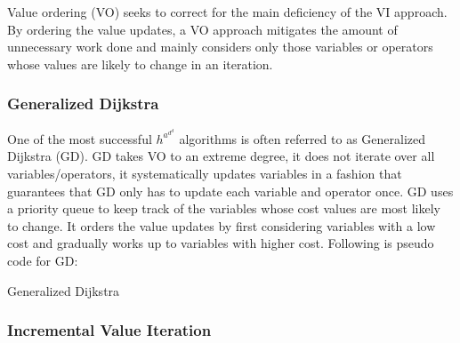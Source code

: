 Value ordering (VO) seeks to correct for the main deficiency of the VI approach. By ordering the value updates, a VO approach mitigates the amount of unnecessary work done and mainly considers only those variables or operators whose values are likely to change in an iteration. 

\subsubsection{Generalized Dijkstra}

One of the most successful $h^a^d^d$ algorithms is often referred to as Generalized Dijkstra (GD). GD takes VO to an extreme degree, it does not iterate over all variables/operators, it systematically updates variables in a fashion that guarantees that GD only has to update each variable and operator once. GD uses a priority queue to keep track of the variables whose cost values are most likely to change. It orders the value updates by first considering variables with a low cost and gradually works up to variables with higher cost. Following is pseudo code for GD:

\newpage

\begin{algorithm*}[H]
 \caption{Generalized Dijkstra}
\end{algorithm*}

\subsubsection{Incremental Value Iteration}

